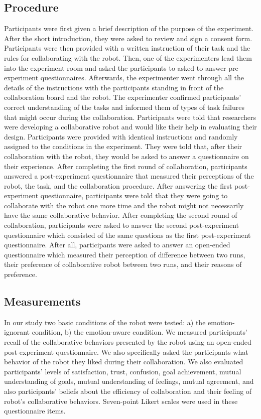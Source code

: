 \documentclass{sig-alternate-05-2015}
\begin{document}
\subsection{Procedure}
\label{sec:procedure}
Participants were first given a brief description of the purpose of the
experiment. After the short introduction, they were asked to review and sign a
consent form. Participants were then provided with a written instruction of
their task and the rules for collaborating with the robot. Then, one of the
experimenters lead them into the experiment room and asked the participants
to asked to answer pre-experiment questionnaires. Afterwards, the experimenter
went through all the details of the instructions with the participants
standing in front of the collaboration board and the robot. The experimenter
confirmed participants' correct understanding of the tasks and informed them
of types of task failures that might occur during the collaboration.
Participants were told that researchers were developing a collaborative robot
and would like their help in evaluating their design. Participants were provided
with identical instructions and randomly assigned to the conditions in the
experiment. They were told that, after their collaboration with the robot, they
would be asked to answer a questionnaire on their experience. After completing
the first round of collaboration, participants answered a post-experiment
questionnaire that measured their perceptions of the robot, the task, and
the collaboration procedure. After answering the first post-experiment
questionnaire, participants were told that they were going to collaborate with
the robot one more time and the robot might not necessarily have the same
collaborative behavior. After completing the second round of collaboration,
participants were asked to answer the second post-experiment questionnaire which
consisted of the same questions as the first post-experiment questionnaire.
After all, participants were asked to answer an open-ended questionnaire which
measured their perception of difference between two runs, their preference of
collaborative robot between two runs, and their reasons of preference.

\subsection{Measurements}
\label{sec:Measurements}
In our study two basic conditions of the robot were tested: a) the
emotion-ignorant condition, b) the emotion-aware condition. We measured
participants' recall of the collaborative behaviors presented by the robot using
an open-ended post-experiment questionnaire. We also specifically asked the
participants what behavior of the robot they liked during their collaboration.
We also evaluated participants' levels of satisfaction, trust, confusion, goal
achievement, mutual understanding of goals, mutual understanding of feelings,
mutual agreement, and also participants' beliefs about the efficiency of
collaboration and their feeling of robot's collaborative behaviors. Seven-point
Likert scales were used in these questionnaire items.
\end{document}
